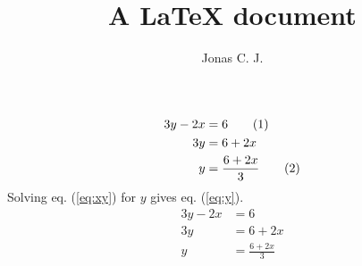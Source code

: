\documentclass[a4paper, 12pt]{article}
\title{A \LaTeX{} document}
\author{Jonas C. J.}
\newcommand{\numberthis}[0]{ \addtocounter{equation}{1} \tag{\theequation} }
\begin{document}
\begin{align*}
3y - 2x &= 6 \label{eq:xy}\numberthis \\
3y &= 6+2x \\
y &= \frac{6+2x}{3} \label{eq:y} \numberthis
\end{align*}
Solving eq. (\ref{eq:xy}) for $y$ gives eq. (\ref{eq:y}).
\begin{align}
3y - 2x &= 6 \\
3y &= 6+2x \nonumber  \\
y &= \frac{6+2x}{3}
\end{align}
\end{document}
